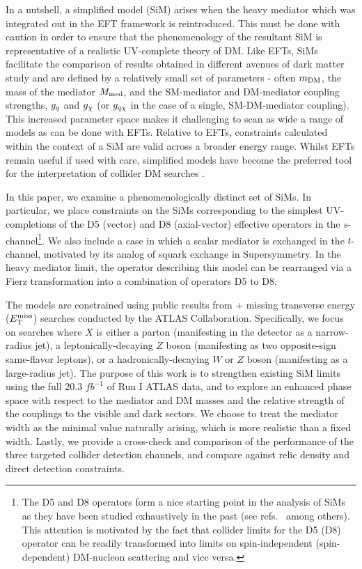 In a nutshell, a simplified model (SiM) arises when the heavy mediator which was integrated out in the EFT framework is reintroduced. This must be done with caution in order to ensure that the phenomenology of the resultant SiM is representative of a realistic UV-complete theory of DM.
%
Like EFTs, SiMs facilitate the comparison of results obtained in  different avenues of dark matter study \cite{DiFranzo:2013vra, Buckley:2014fba} and are defined by a relatively small set of parameters - often $m_{\mathrm{DM}}$, the mass of the mediator $M_{\mathrm{med}}$, and the SM-mediator and DM-mediator coupling strengths, $g_q$ and $g_{\chi}$ (or $g_{q \chi}$ in the case of a single, SM-DM-mediator coupling). This increased parameter space makes it challenging to scan as wide a range of models as can be done with EFTs.
Relative to EFTs, constraints calculated within the context of a SiM are valid across a broader energy range. 
%
Whilst EFTs remain useful if used with care, simplified models have become the preferred tool for the interpretation of collider DM searches \cite{DM_MET_LHC, DMOxfordReport, DMForumReport, Harris:2014hga,Buchmueller:2014yoa}.


In this paper, we examine a phenomenologically distinct set of SiMs. In particular, we place constraints on the SiMs corresponding to the simplest UV-completions of the D5 (vector) and D8 (axial-vector) effective operators in the $s$-channel\footnote{The D5 and D8 operators form a nice starting point in the analysis of SiMs as they have been studied exhaustively in the past (see refs.~\cite{Aad:1363019, ATLAS-CONF-2012-147, CMS-PAS-EXO-12-048, Buckley:2013jwa, Abdallah:1472683, MonoX, ValidEFT, ValidEFT_part2, ValidEFT_part3} among others). This attention is motivated by the fact that collider limits for the D5 (D8) operator can be readily transformed into limits on spin-independent (spin-dependent) DM-nucleon scattering and vice versa.}. We also include a case in which a scalar mediator is exchanged in the $t$-channel, motivated by its analog of squark exchange in Supersymmetry. In the heavy mediator limit, the operator describing this model can be rearranged via a Fierz transformation into a combination of operators D5 to D8.

The models are constrained using public results from \monoX + missing transverse energy ($E_{\mathrm{T}}^{\mathrm{miss}}$) searches conducted by the ATLAS Collaboration. Specifically, we focus on searches where $X$ is either a parton (manifesting in the detector as a narrow-radius jet), a leptonically-decaying $Z$ boson (manifesting as two opposite-sign same-flavor leptons), or a hadronically-decaying $W$ or $Z$ boson (manifesting as a large-radius jet). The purpose of this work is to strengthen existing SiM limits using the full 20.3 $fb^{-1}$ of Run I ATLAS data, and to explore an enhanced phase space with respect to the mediator and DM masses and the relative strength of the couplings to the visible and dark sectors. We choose to treat the mediator width as the minimal value naturally arising, which is more realistic than a fixed width. Lastly, we provide a cross-check and comparison of the performance of the three targeted collider detection channels, and compare against relic density and direct detection constraints.

